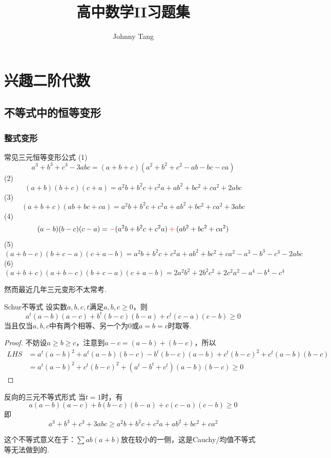 \documentclass[cn,hazy,black,10pt,normal]{elegantnote}
\title{高中数学II习题集}
\author{Johnny Tang}
\institute{DEEP Team}
\date{\zhtoday}
\begin{document}
\maketitle

\chapter{兴趣二阶代数}

\section{不等式中的恒等变形}

\subsection{整式变形}

\begin{proposition}{常见三元恒等变形公式}
	(1)$$a^3+b^3+c^3-3abc = (a+b+c)(a^2+b^2+c^2-ab-bc-ca)$$
	(2)$$(a+b)(b+c)(c+a) = a^2b + b^2c + c^2a + ab^2 + bc^2 + ca^2 +2abc$$
	(3)$$(a+b+c)(ab+bc+ca) = a^2b + b^2c + c^2a + ab^2 + bc^2 + ca^2 +3abc$$
	(4)$$(a-b)(b-c)(c-a) = \color{red}-\color{black}(a^2b+b^2c+c^2a)\color{red}+\color{black}(ab^2+bc^2+ca^2)$$
	(5)$$(a+b-c)(b+c-a)(c+a-b) = a^2b+b^2c+c^2a+ab^2+bc^2+ca^2-a^3-b^3-c^3-2abc$$
	(6)$$(a+b+c)(a+b-c)(b+c-a)(c+a-b) = 2a^2b^2 + 2b^2c^2 + 2c^2a^2 - a^4 -b^4-c^4$$
\end{proposition}

然而最近几年三元变形不太常考.

\begin{theorem}{Schur不等式}
	设实数$a,b,c,t$满足$a,b,c \geq 0$，则$$a^t(a-b)(a-c) + b^t(b-c)(b-a) + c^t(c-a)(c-b) \geq 0$$
	当且仅当$a,b,c$中有两个相等、另一个为$0$或$a=b=c$时取等.
\end{theorem}
\begin{proof}
	不妨设$a \geq b \geq c$，注意到$a-c=(a-b)+(b-c)$，所以
	\begin{align*}
		LHS &= a^t(a-b)^2 + a^t(a-b)(b-c) - b^t(b-c)(a-b) + c^t(b-c)^2 + c^t(a-b)(b-c) \\
		&= a^t(a-b)^2 + c^t(b-c)^2 + (a^t-b^t+c^t)(a-b)(b-c) \geq 0
	\end{align*}
\end{proof}

\begin{corollary}{反向的三元不等式形式}
	当$t=1$时，有$$a(a-b)(a-c) + b(b-c)(b-a) + c(c-a)(c-b) \geq 0$$
	即$$a^3+b^3+c^3+3abc \geq a^2b + b^2c + c^2a + ab^2 + bc^2 + ca^2$$
\end{corollary}
\begin{remark}
	这个不等式意义在于：$\sum ab(a+b)$放在较小的一侧，这是Cauchy/均值不等式等无法做到的.
\end{remark}
\end{document}
